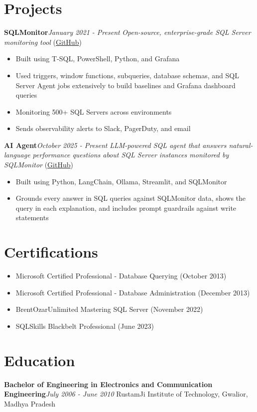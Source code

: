 \documentclass[10pt,a4paper]{article}
\begin{document}
\section{Projects}
\noindent\textbf{SQLMonitor}\hfill \textit{January 2021 - Present}
\textit{Open-source, enterprise-grade SQL Server monitoring tool} (\href{https://github.com/imajaydwivedi/SQLMonitor}{GitHub})
\begin{itemize}
  \item Built using T-SQL, PowerShell, Python, and Grafana
  \item Used triggers, window functions, subqueries, database schemas, and SQL Server Agent jobs extensively to build baselines and Grafana dashboard queries
  \item Monitoring 500+ SQL Servers across environments
  \item Sends observability alerts to Slack, PagerDuty, and email
\end{itemize}
\vspace{14.7pt}
\noindent\textbf{AI Agent}\hfill \textit{October 2025 - Present}
\textit{LLM-powered SQL agent that answers natural-language performance questions about SQL Server instances monitored by SQLMonitor} (\href{https://github.com/imajaydwivedi/SQLMonitor/tree/dev/AI-Agent}{GitHub})
\begin{itemize}
  \item Built using Python, LangChain, Ollama, Streamlit, and SQLMonitor
  \item Grounds every answer in SQL queries against SQLMonitor data, shows the query in each explanation, and includes prompt guardrails against write statements
\end{itemize}
\section{Certifications}
\begin{itemize}
  \item Microsoft Certified Professional - Database Querying (October 2013)
  \item Microsoft Certified Professional - Database Administration (December 2013)
  \item BrentOzarUnlimited Mastering SQL Server (November 2022)
  \item SQLSkills Blackbelt Professional (June 2023)
\end{itemize}
\section{Education}
\noindent\textbf{Bachelor of Engineering in Electronics and Communication Engineering}\hfill \textit{July 2006 - June 2010}
RustamJi Institute of Technology, Gwalior, Madhya Pradesh
\end{document}
